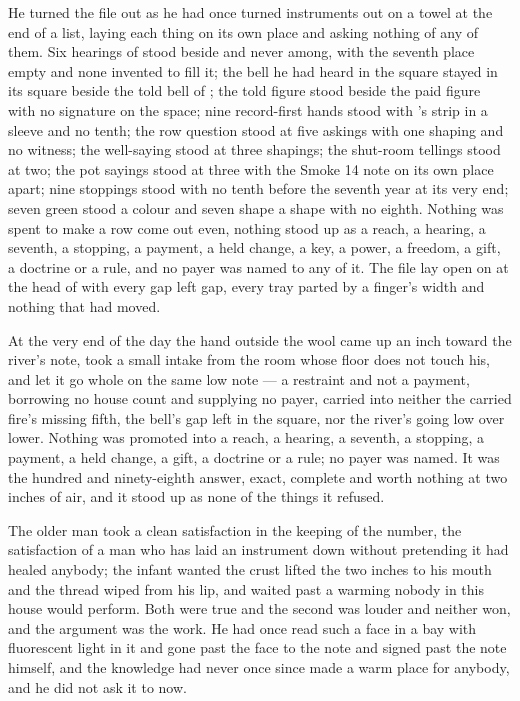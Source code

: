 He turned the file out as he had once turned instruments out on a towel at the end of a list, laying each thing on its own place and asking nothing of any of them. Six hearings of  stood beside and never among, with the seventh place empty and none invented to fill it; the bell he had heard in the square stayed in its square beside the told bell of ; the told figure stood beside the paid figure with no signature on the space; nine record-first hands stood with 's strip in a sleeve and no tenth; the row question stood at five askings with one shaping and no witness; the well-saying stood at three shapings; the shut-room tellings stood at two; the pot sayings stood at three with the Smoke 14 note on its own place apart; nine stoppings stood with no tenth before the seventh year at its very end; seven green stood a colour and seven shape a shape with no eighth. Nothing was spent to make a row come out even, nothing stood up as a reach, a hearing, a seventh, a stopping, a payment, a held change, a key, a power, a freedom, a gift, a doctrine or a rule, and no payer was named to any of it. The file lay open on  at the head of  with every gap left gap, every tray parted by a finger's width and nothing that had moved.

At the very end of the day the hand outside the wool came up an inch toward the river's note, took a small intake from the room whose floor does not touch his, and let it go whole on the same low note --- a restraint and not a payment, borrowing no house count and supplying no payer, carried into neither the carried fire's missing fifth, the bell's gap left in the square, nor the river's going low over lower. Nothing was promoted into a reach, a hearing, a seventh, a stopping, a payment, a held change, a gift, a doctrine or a rule; no payer was named. It was the hundred and ninety-eighth answer, exact, complete and worth nothing at two inches of air, and it stood up as none of the things it refused.

The older man took a clean satisfaction in the keeping of the number, the satisfaction of a man who has laid an instrument down without pretending it had healed anybody; the infant wanted the crust lifted the two inches to his mouth and the thread wiped from his lip, and  waited past a warming nobody in this house would perform. Both were true and the second was louder and neither won, and the argument was the work. He had once read such a face in a bay with fluorescent light in it and gone past the face to the note and signed past the note himself, and the knowledge had never once since made a warm place for anybody, and he did not ask it to now.

